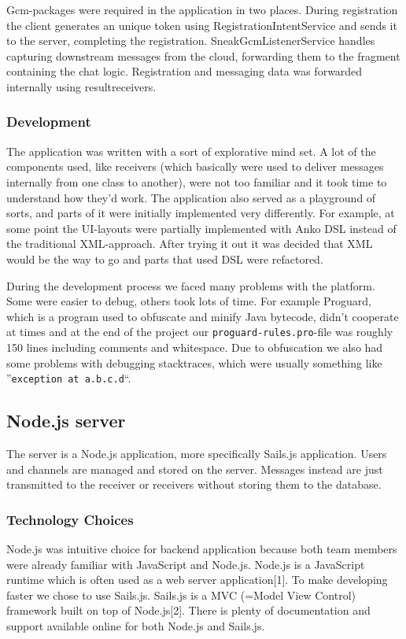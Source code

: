 Gcm-packages were required in the application in two places. During registration the client generates an unique token using RegistrationIntentService and sends it to the server, completing the registration. SneakGcmListenerService handles capturing downstream messages from the cloud, forwarding them to the fragment containing the chat logic. Registration and messaging data was forwarded internally using resultreceivers.

\subsubsection{Development}

The application was written with a sort of explorative mind set. A lot of the components used, like receivers (which basically were used to deliver messages internally from one class to another), were not too familiar and it took time to understand how they'd work. The application also served as a playground of sorts, and parts of it were initially implemented very differently. For example, at some point the UI-layouts were partially implemented with Anko DSL instead of the traditional XML-approach. After trying it out it was decided that XML would be the way to go and parts that used DSL were refactored.

During the development process we faced many problems with the platform. Some were easier to debug, others took lots of time. For example Proguard, which is a program used to obfuscate and minify Java bytecode, didn't cooperate at times and at the end of the project our \verb|proguard-rules.pro|-file was roughly 150 lines including comments and whitespace. Due to obfuscation we also had some problems with debugging stacktraces, which were usually something like ''\verb|exception at a.b.c.d|``. 

\subsection{Node.js server}
The server is a Node.js application, more specifically Sails.js application. Users and channels are managed and stored on the server. Messages instead are just transmitted to the receiver or receivers without storing them to the database. 

\subsubsection{Technology Choices}
Node.js was intuitive choice for backend application because both team members were already familiar with JavaScript and Node.js. Node.js is a JavaScript runtime which is often used as a web server application[1]. To make developing faster we chose to use Sails.js. Sails.js is a MVC (=Model View Control) framework built on top of Node.js[2]. There is plenty of documentation and support available online for both Node.js and Sails.js.

